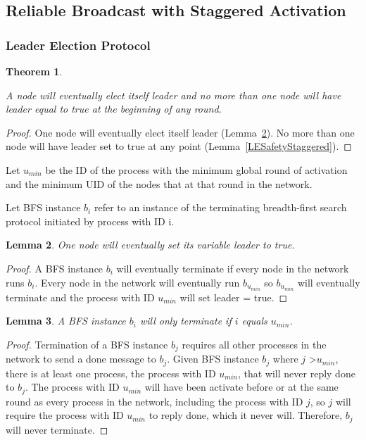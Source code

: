 \documentclass[english]{article}
\newtheorem{theorem}{Theorem}[section]
\newtheorem{lemma}[theorem]{Lemma}
\begin{document}
\subsection {Reliable Broadcast with Staggered Activation}

\subsubsection{Leader Election Protocol}

\begin{theorem}
\label{LeaderElectionStaggered}

A node will eventually elect itself leader and no more than one node will have leader equal to true at the beginning of any round. 
\end{theorem}
\begin{proof}
One node will eventually elect itself leader (Lemma~\ref{LELivenessStaggered}).
No more than one node will have leader set to true at any point (Lemma~\ref{LESafetyStaggered}).
\end{proof}

\begin{definition}
Let $u_{min}$ be the ID of the process with the minimum global round of activation and the minimum UID  of the nodes that at that round in the network. 
\end{definition}

\begin{definition}
Let BFS instance $b_i$ refer to an instance of the terminating breadth-first search protocol initiated by process with ID i.
\end{definition}


\begin{lemma}
\label{LELivenessStaggered}
  One node will eventually set its variable leader to true.
\end{lemma}
\begin{proof}
A BFS instance $b_i$ will eventually terminate if every node in the network runs $b_i$. 
Every node in the network will eventually run $b_{u_{min}}$ so $b_{u_{min}}$ will eventually terminate and the process with ID $u_{min}$ will set leader = true.
\end{proof}


\begin{lemma}
\label{BFSTerminationStaggered}
  A BFS instance $b_i$ will only terminate if $i$ equals $u_{min}$.
\end{lemma}
\begin{proof}
Termination of a BFS instance $b_j$ requires all other processes in the network to send a done message to $b_j$.
Given BFS instance $b_j$ where $j$ \textgreater $u_{min}$, there is at least one process, the process with ID $u_{min}$, that will never reply done to $b_j$. The process with ID $u_{min}$ will have been activate before or at the same round as every process in the network, including the process with ID $j$, so $j$ will require the process with ID $u_{min}$ to reply done, which it never will.
Therefore, $b_j$ will never terminate.
\end{proof}
\end{document}
